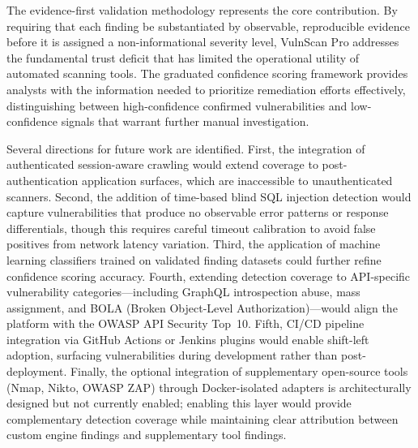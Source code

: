 \documentclass[conference]{IEEEtran}
\begin{document}
The evidence-first validation methodology represents the core contribution. By requiring that each finding be substantiated by observable, reproducible evidence before it is assigned a non-informational severity level, VulnScan Pro addresses the fundamental trust deficit that has limited the operational utility of automated scanning tools. The graduated confidence scoring framework provides analysts with the information needed to prioritize remediation efforts effectively, distinguishing between high-confidence confirmed vulnerabilities and low-confidence signals that warrant further manual investigation.

Several directions for future work are identified. First, the integration of authenticated session-aware crawling would extend coverage to post-authentication application surfaces, which are inaccessible to unauthenticated scanners. Second, the addition of time-based blind SQL injection detection would capture vulnerabilities that produce no observable error patterns or response differentials, though this requires careful timeout calibration to avoid false positives from network latency variation. Third, the application of machine learning classifiers trained on validated finding datasets could further refine confidence scoring accuracy. Fourth, extending detection coverage to API-specific vulnerability categories---including GraphQL introspection abuse, mass assignment, and BOLA (Broken Object-Level Authorization)---would align the platform with the OWASP API Security Top~10. Fifth, CI/CD pipeline integration via GitHub Actions or Jenkins plugins would enable shift-left adoption, surfacing vulnerabilities during development rather than post-deployment. Finally, the optional integration of supplementary open-source tools (Nmap, Nikto, OWASP ZAP) through Docker-isolated adapters is architecturally designed but not currently enabled; enabling this layer would provide complementary detection coverage while maintaining clear attribution between custom engine findings and supplementary tool findings.

\balance
\end{document}

